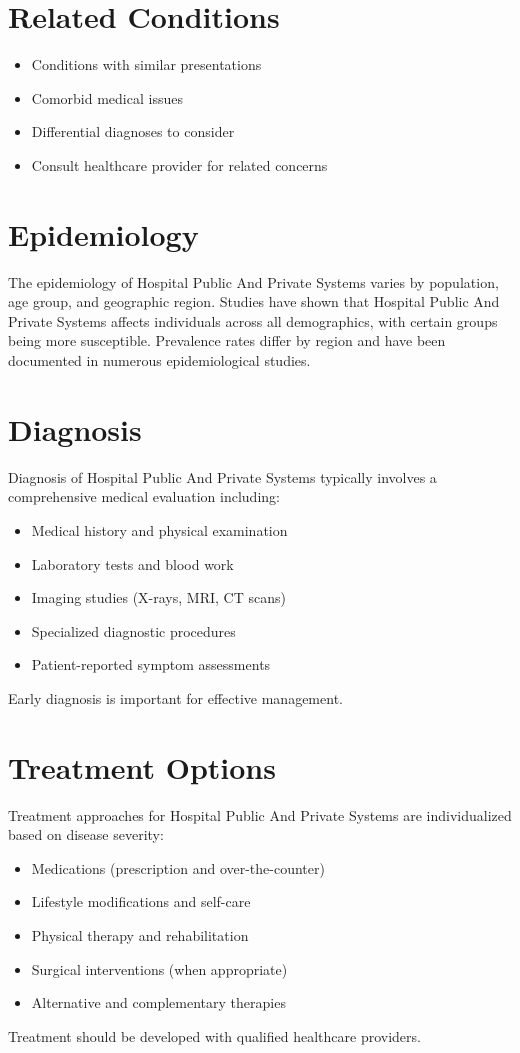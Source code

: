 \section*{Related Conditions}
\begin{itemize}
  \item Conditions with similar presentations
  \item Comorbid medical issues
  \item Differential diagnoses to consider
  \item Consult healthcare provider for related concerns
\end{itemize}

\section*{Epidemiology}
The epidemiology of Hospital Public And Private Systems varies by population, age group, and geographic region. Studies have shown that Hospital Public And Private Systems affects individuals across all demographics, with certain groups being more susceptible. Prevalence rates differ by region and have been documented in numerous epidemiological studies.

\section*{Diagnosis}
Diagnosis of Hospital Public And Private Systems typically involves a comprehensive medical evaluation including:
\begin{itemize}
  \item Medical history and physical examination
  \item Laboratory tests and blood work
  \item Imaging studies (X-rays, MRI, CT scans)
  \item Specialized diagnostic procedures
  \item Patient-reported symptom assessments
\end{itemize}
Early diagnosis is important for effective management.

\section*{Treatment Options}
Treatment approaches for Hospital Public And Private Systems are individualized based on disease severity:
\begin{itemize}
  \item Medications (prescription and over-the-counter)
  \item Lifestyle modifications and self-care
  \item Physical therapy and rehabilitation
  \item Surgical interventions (when appropriate)
  \item Alternative and complementary therapies
\end{itemize}
Treatment should be developed with qualified healthcare providers.


